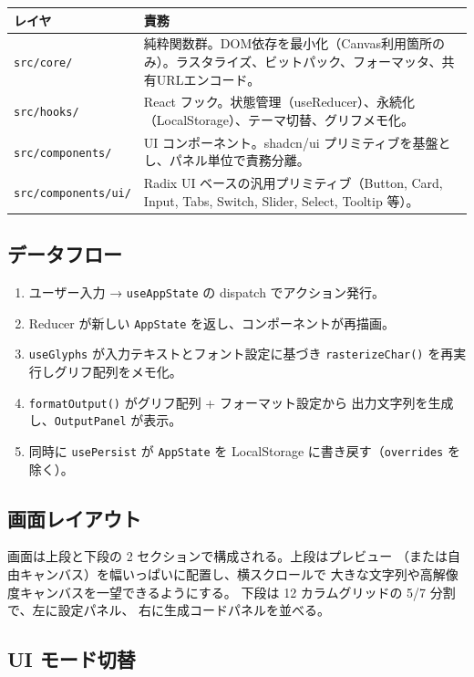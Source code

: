 \begin{tabularx}{\textwidth}{l X}
\toprule
\textbf{レイヤ} & \textbf{責務} \\
\midrule
\texttt{src/core/} & 純粋関数群。DOM依存を最小化（Canvas利用箇所のみ）。ラスタライズ、ビットパック、フォーマッタ、共有URLエンコード。\\
\texttt{src/hooks/} & React フック。状態管理（useReducer）、永続化（LocalStorage）、テーマ切替、グリフメモ化。\\
\texttt{src/components/} & UI コンポーネント。shadcn/ui プリミティブを基盤とし、パネル単位で責務分離。\\
\texttt{src/components/ui/} & Radix UI ベースの汎用プリミティブ（Button, Card, Input, Tabs, Switch, Slider, Select, Tooltip 等）。\\
\bottomrule
\end{tabularx}

\subsection{データフロー}

\begin{enumerate}[leftmargin=*,itemsep=2pt]
  \item ユーザー入力 → \texttt{useAppState} の dispatch でアクション発行。
  \item Reducer が新しい \texttt{AppState} を返し、コンポーネントが再描画。
  \item \texttt{useGlyphs} が入力テキストとフォント設定に基づき
        \texttt{rasterizeChar()} を再実行しグリフ配列をメモ化。
  \item \texttt{formatOutput()} がグリフ配列 + フォーマット設定から
        出力文字列を生成し、\texttt{OutputPanel} が表示。
  \item 同時に \texttt{usePersist} が \texttt{AppState} を
        LocalStorage に書き戻す（\texttt{overrides} を除く）。
\end{enumerate}

\subsection{画面レイアウト}

画面は上段と下段の 2 セクションで構成される。上段はプレビュー
（または自由キャンバス）を幅いっぱいに配置し、横スクロールで
大きな文字列や高解像度キャンバスを一望できるようにする。
下段は 12 カラムグリッドの 5/7 分割で、左に設定パネル、
右に生成コードパネルを並べる。

\subsection{UI モード切替}

